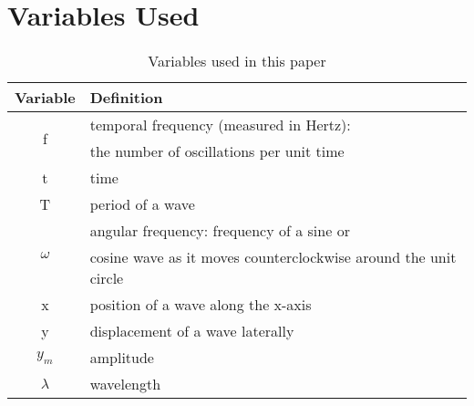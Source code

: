 \chapter{Variables Used}\label{appendix:global-variables}
\begin{table}[h!]
	\begin{tabular}{| c | l |}
		\hline
		Variable & Definition \\
		\hline
		\multirow{2}{*}{f} & temporal frequency (measured in Hertz): \\ & the number of oscillations per unit time \\
		t & time \\
		T & period of a wave \\
		\multirow{2}{*}{$\omega$} & angular frequency: frequency of a sine or \\ & cosine wave as it moves counterclockwise around the unit circle \\
		x & position of a wave along the x-axis \\
		y & displacement of a wave laterally \\
		$y_m$ & amplitude \\
		$\lambda$ & wavelength \\
		\hline
	\end{tabular}
\caption{Variables used in this paper}
\label{tbl:global-variables}
\end{table}